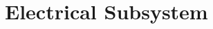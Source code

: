 \documentclass[../../main.tex]{subfiles}
\begin{document}
\chapter{Electrical Subsystem}





\end{document}

